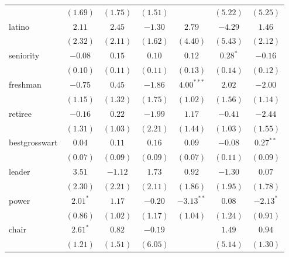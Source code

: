 \documentclass[12pt]{article}
\begin{document}
\begin{table}
\begin{center}
\begin{tabular}{l c c c c c c }
			& $(1.69)$     & $(1.75)$      & $(1.51)$       &              & $(5.22)$       & $(5.25)$      \\
			latino                 & $2.11$       & $2.45$        & $-1.30$        & $2.79$       & $-4.29$        & $1.46$        \\
			& $(2.32)$     & $(2.11)$      & $(1.62)$       & $(4.40)$     & $(5.43)$       & $(2.12)$      \\
			seniority              & $-0.08$      & $0.15$        & $0.10$         & $0.12$       & $0.28^{*}$     & $-0.16$       \\
			& $(0.10)$     & $(0.11)$      & $(0.11)$       & $(0.13)$     & $(0.14)$       & $(0.12)$      \\
			freshman               & $-0.75$      & $0.45$        & $-1.86$        & $4.00^{***}$ & $2.02$         & $-2.00$       \\
			& $(1.15)$     & $(1.32)$      & $(1.75)$       & $(1.02)$     & $(1.56)$       & $(1.14)$      \\
			retiree                & $-0.16$      & $0.22$        & $-1.99$        & $1.17$       & $-0.41$        & $-2.44$       \\
			& $(1.31)$     & $(1.03)$      & $(2.21)$       & $(1.44)$     & $(1.03)$       & $(1.55)$      \\
			bestgrosswart          & $0.04$       & $0.11$        & $0.16$         & $0.09$       & $-0.08$        & $0.27^{**}$   \\
			& $(0.07)$     & $(0.09)$      & $(0.09)$       & $(0.07)$     & $(0.11)$       & $(0.09)$      \\
			leader                 & $3.51$       & $-1.12$       & $1.73$         & $0.92$       & $-1.30$        & $0.07$        \\
			& $(2.30)$     & $(2.21)$      & $(2.11)$       & $(1.86)$     & $(1.95)$       & $(1.78)$      \\
			power                  & $2.01^{*}$   & $1.17$        & $-0.20$        & $-3.13^{**}$ & $0.08$         & $-2.13^{*}$   \\
			& $(0.86)$     & $(1.02)$      & $(1.17)$       & $(1.04)$     & $(1.24)$       & $(0.91)$      \\
			chair                  & $2.61^{*}$   & $0.82$        & $-0.19$        &              & $1.49$         & $0.94$        \\
			& $(1.21)$     & $(1.51)$      & $(6.05)$       &              & $(5.14)$       & $(1.30)$      \\
			\hline

\end{tabular}
\end{center}
\end{table}
\end{document}
